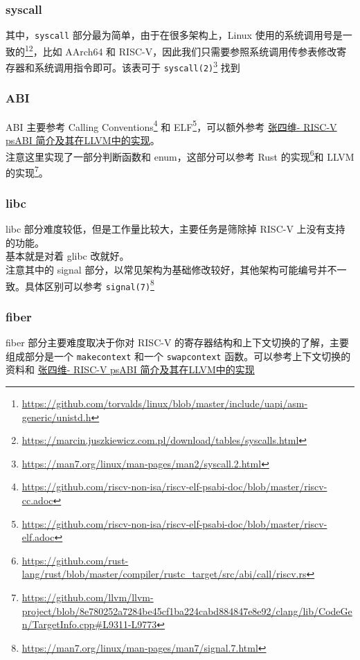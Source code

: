 \documentclass[UTF-8]{ctexbeamer}
\begin{document}
\begin{frame}[fragile]
	\frametitle{syscall}

	其中，\verb|syscall| 部分最为简单，由于在很多架构上，Linux 使用的系统调用号是一致的\footnote{\url{https://github.com/torvalds/linux/blob/master/include/uapi/asm-generic/unistd.h}}\footnote{\url{https://marcin.juszkiewicz.com.pl/download/tables/syscalls.html}}，比如 AArch64 和 RISC-V，因此我们只需要参照系统调用传参表修改寄存器和系统调用指令即可。该表可于 \verb|syscall(2)|\footnote{\url{https://man7.org/linux/man-pages/man2/syscall.2.html}} 找到

\end{frame}

\begin{frame}[fragile]
	\frametitle{ABI}

	ABI 主要参考 Calling Conventions\footnote{\url{https://github.com/riscv-non-isa/riscv-elf-psabi-doc/blob/master/riscv-cc.adoc}} 和 ELF\footnote{\url{https://github.com/riscv-non-isa/riscv-elf-psabi-doc/blob/master/riscv-elf.adoc}}，可以额外参考 \href{https://www.bilibili.com/video/BV123411v7rN}{张四维- RISC-V psABI 简介及其在LLVM中的实现}。\\

	注意这里实现了一部分判断函数和 enum，这部分可以参考 Rust 的实现\footnote{\url{https://github.com/rust-lang/rust/blob/master/compiler/rustc_target/src/abi/call/riscv.rs}}和 LLVM 的实现\footnote{\url{https://github.com/llvm/llvm-project/blob/8e780252a7284be45cf1ba224cabd884847e8e92/clang/lib/CodeGen/TargetInfo.cpp\#L9311-L9773}}。

\end{frame}

\begin{frame}[fragile]
	\frametitle{libc}

	libc 部分难度较低，但是工作量比较大，主要任务是筛除掉 RISC-V 上没有支持的功能。\\
	基本就是对着 glibc 改就好。\\
	注意其中的 signal 部分，以常见架构为基础修改较好，其他架构可能编号并不一致。具体区别可以参考 \verb|signal(7)|\footnote{\url{https://man7.org/linux/man-pages/man7/signal.7.html}}

\end{frame}

\begin{frame}[fragile]
	\frametitle{fiber}

	fiber 部分主要难度取决于你对 RISC-V 的寄存器结构和上下文切换的了解，主要组成部分是一个 \verb|makecontext| 和一个 \verb|swapcontext| 函数。可以参考上下文切换的资料和 \href{https://www.bilibili.com/video/BV123411v7rN}{张四维- RISC-V psABI 简介及其在LLVM中的实现}

\end{frame}
\end{document}
